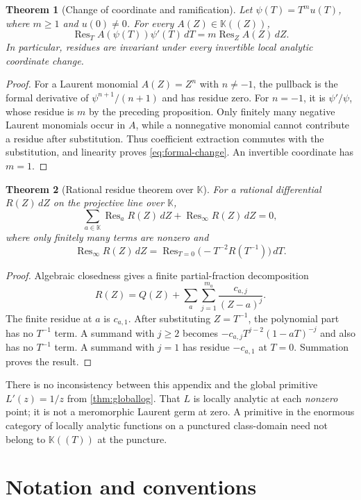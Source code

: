 \documentclass[11pt,a4paper]{article}
\numberwithin{equation}{section}
\newtheorem{theorem}{Theorem}[section]
\theoremstyle{definition}
\newcommand{\K}{\mathbb K}
\newcommand{\Res}{\operatorname{Res}}
\begin{document}
\begin{theorem}[Change of coordinate and ramification]
Let $\psi(T)=T^m u(T)$, where $m\geq1$ and $u(0)\neq0$. For every
$A(Z)\in\K((Z))$,
\begin{equation}\label{eq:formal-change}
 \Res_T A(\psi(T))\psi'(T)\,dT
       =m\Res_Z A(Z)\,dZ.
\end{equation}
In particular, residues are invariant under every invertible local analytic
coordinate change.
\end{theorem}
\begin{proof}
For a Laurent monomial $A(Z)=Z^n$ with $n\neq-1$, the pullback is the
formal derivative of $\psi^{n+1}/(n+1)$ and has residue zero. For $n=-1$,
it is $\psi'/\psi$, whose residue is $m$ by the preceding proposition.
Only finitely many negative Laurent monomials occur in $A$, while a
nonnegative monomial cannot contribute a residue after substitution.
Thus coefficient extraction commutes with the substitution, and linearity
proves \eqref{eq:formal-change}. An invertible coordinate has $m=1$.
\end{proof}

\begin{theorem}[Rational residue theorem over $\K$]
For a rational differential $R(Z)\,dZ$ on the projective line over $\K$,
\[
 \sum_{a\in\K}\Res_a R(Z)\,dZ+\Res_\infty R(Z)\,dZ=0,
\]
where only finitely many terms are nonzero and
\[
 \Res_\infty R(Z)\,dZ
      =\Res_{T=0}\bigl(-T^{-2}R(T^{-1})\bigr)\,dT.
\]
\end{theorem}
\begin{proof}
Algebraic closedness gives a finite partial-fraction decomposition
\[
 R(Z)=Q(Z)+\sum_a\sum_{j=1}^{m_a}\frac{c_{a,j}}{(Z-a)^j}.
\]
The finite residue at $a$ is $c_{a,1}$. After substituting $Z=T^{-1}$,
the polynomial part has no $T^{-1}$ term. A summand with $j\geq2$ becomes
$-c_{a,j}T^{j-2}(1-aT)^{-j}$ and also has no $T^{-1}$ term. A summand
with $j=1$ has residue $-c_{a,1}$ at $T=0$. Summation proves the result.
\end{proof}

There is no inconsistency between this appendix and the global primitive
$L'(z)=1/z$ from \cref{thm:globallog}. That $L$ is locally analytic at each
\emph{nonzero} point; it is not a meromorphic Laurent germ at zero. A
primitive in the enormous category of locally analytic functions on a
punctured class-domain need not belong to $\K((T))$ at the puncture.

\section{Notation and conventions}
\end{document}
